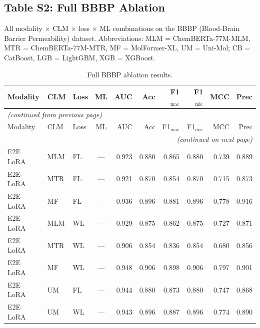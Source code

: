 \documentclass[9pt,a4paper]{article}
\begin{document}
\newpage

\subsection*{Table S2: Full BBBP Ablation}

All modality $\times$ CLM $\times$ loss $\times$ ML combinations on the BBBP
(Blood-Brain Barrier Permeability) dataset.
Abbreviations: MLM = ChemBERTa-77M-MLM, MTR = ChemBERTa-77M-MTR,
MF = MolFormer-XL, UM = Uni-Mol; CB = CatBoost, LGB = LightGBM, XGB = XGBoost.

\begin{scriptsize}
\begin{longtable}{lllcrrrrrr}
\caption{Full BBBP ablation results.}
\label{tab:s2_bbbp} \\
\toprule
Modality & CLM & Loss & ML & AUC & Acc & F1$_\text{mac}$ & F1$_\text{mic}$ & MCC & Prec \\
\midrule
\endfirsthead
\multicolumn{10}{l}{\footnotesize\textit{(continued from previous page)}} \\
\toprule
Modality & CLM & Loss & ML & AUC & Acc & F1$_\text{mac}$ & F1$_\text{mic}$ & MCC & Prec \\
\midrule
\endhead
\midrule
\multicolumn{10}{r}{\footnotesize\textit{(continued on next page)}} \\
\endfoot
\bottomrule
\endlastfoot
E2E LoRA & MLM & FL & --- & 0.923 & 0.880 & 0.865 & 0.880 & 0.739 & 0.889 \\
E2E LoRA & MTR & FL & --- & 0.921 & 0.870 & 0.854 & 0.870 & 0.715 & 0.873 \\
E2E LoRA & MF  & FL & --- & 0.936 & 0.896 & 0.881 & 0.896 & 0.778 & 0.916 \\
E2E LoRA & MLM & WL & --- & 0.929 & 0.875 & 0.862 & 0.875 & 0.727 & 0.871 \\
E2E LoRA & MTR & WL & --- & 0.906 & 0.854 & 0.836 & 0.854 & 0.680 & 0.856 \\
E2E LoRA & MF  & WL & --- & 0.948 & 0.906 & 0.898 & 0.906 & 0.797 & 0.901 \\
E2E LoRA & UM  & FL & --- & 0.944 & 0.880 & 0.873 & 0.880 & 0.747 & 0.868 \\
E2E LoRA & UM  & WL & --- & 0.943 & 0.896 & 0.887 & 0.896 & 0.774 & 0.890 \\

\end{longtable}
\end{scriptsize}
\end{document}
